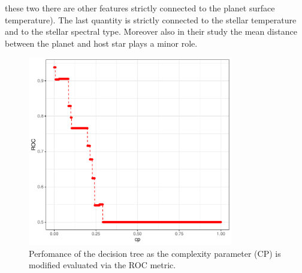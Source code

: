\documentclass[
12pt, %
a4paper, %
oneside, %
headinclude,footinclude, %
BCOR5mm, %
]{scrartcl}
\begin{document}
these two there are other features strictly connected to the planet surface temperature). The last quantity is strictly connected to the stellar temperature and to the stellar spectral type. Moreover also in their study the mean distance between the planet and host star plays a minor role.


\begin{figure}[h]
\begin{center}
\includegraphics[width=0.8\textwidth]{Pic/cp_vs_ROC.pdf}
\caption{Perfomance of the decision tree as the complexity parameter (CP) is modified evaluated via the ROC metric. }
\label{cp_vs_ROC}
\end{center}
\end{figure}
\end{document}
